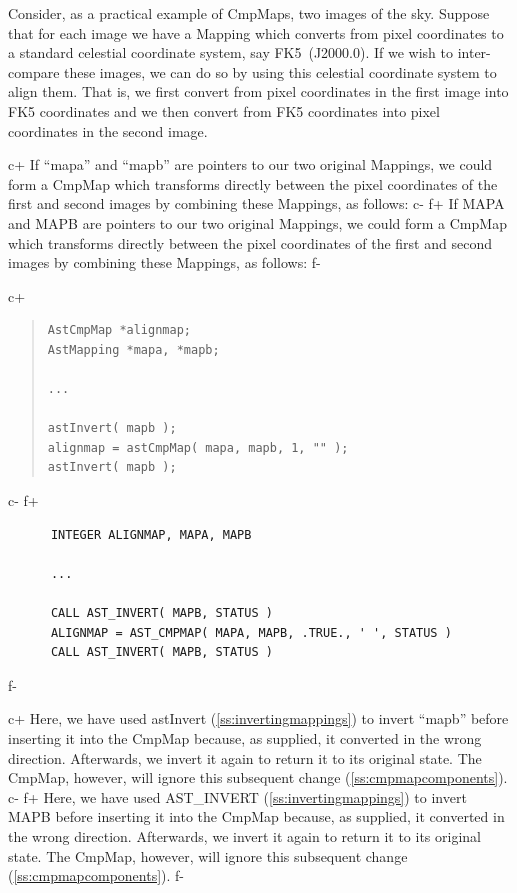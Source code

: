 \documentclass[twoside,11pt]{article}
\newcommand{\secref}[1]{\S\ref{#1}}
\renewcommand{\secref}[1]{\ref{#1}}
\begin{document}
Consider, as a practical example of CmpMaps, two images of the
sky. Suppose that for each image we have a Mapping which converts from
pixel coordinates to a standard celestial coordinate system, say
FK5~(J2000.0). If we wish to inter-compare these images, we can do so
by using this celestial coordinate system to align them. That is, we
first convert from pixel coordinates in the first image into FK5
coordinates and we then convert from FK5 coordinates into pixel
coordinates in the second image.

c+
If ``mapa'' and ``mapb'' are pointers to our two original Mappings, we
could form a CmpMap which transforms directly between the pixel
coordinates of the first and second images by combining these
Mappings, as follows:
c-
f+
If MAPA and MAPB are pointers to our two original Mappings, we could
form a CmpMap which transforms directly between the pixel coordinates
of the first and second images by combining these Mappings, as
follows:
f-

c+
\begin{quote}
\small
\begin{verbatim}
AstCmpMap *alignmap;
AstMapping *mapa, *mapb;

...

astInvert( mapb );
alignmap = astCmpMap( mapa, mapb, 1, "" );
astInvert( mapb );
\end{verbatim}
\normalsize
\end{quote}
c-
f+
\small
\begin{verbatim}
      INTEGER ALIGNMAP, MAPA, MAPB

      ...

      CALL AST_INVERT( MAPB, STATUS )
      ALIGNMAP = AST_CMPMAP( MAPA, MAPB, .TRUE., ' ', STATUS )
      CALL AST_INVERT( MAPB, STATUS )
\end{verbatim}
\normalsize
f-

c+
Here, we have used astInvert (\secref{ss:invertingmappings}) to invert
``mapb'' before inserting it into the CmpMap because, as supplied, it
converted in the wrong direction. Afterwards, we invert it again to
return it to its original state. The CmpMap, however, will ignore this
subsequent change (\secref{ss:cmpmapcomponents}).
c-
f+
Here, we have used AST\_INVERT (\secref{ss:invertingmappings}) to
invert MAPB before inserting it into the CmpMap because, as supplied,
it converted in the wrong direction. Afterwards, we invert it again to
return it to its original state. The CmpMap, however, will ignore this
subsequent change (\secref{ss:cmpmapcomponents}).
f-
\end{document}
